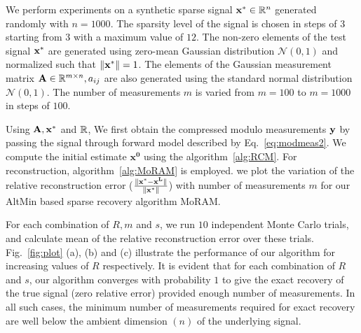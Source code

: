 We perform experiments on a synthetic sparse signal $\mathbf{x^*} \in {\mathbb{R}}^n$ generated randomly with $n=1000$. The sparsity level of the signal is chosen in steps of $3$ starting from $3$ with a maximum value of $12$. The non-zero elements of the test signal $\mathbf{x^*}$ are generated using zero-mean Gaussian distribution $\mathcal{N}(0, 1)$ and normalized such that $\|\mathbf{x^*}\| =1$. The elements of the Gaussian measurement matrix $\mathbf{A} \in {\mathbb{R}}^{m\times n}, a_{ij}$ are also generated using the standard normal distribution $\mathcal{N}(0, 1)$. The number of measurements $m$ is varied from $m = 100$ to $m=1000$ in steps of $100$.  



Using $\mathbf{A, x^*}$ and ${\mathbb{R}}$, We first obtain the compressed modulo measurements $\mathbf{y}$ by passing the signal through forward model described by Eq.~\ref{eq:modmeas2}. We compute the initial estimate $\mathbf{x^0}$ using the algorithm~\ref{alg:RCM}. For reconstruction, algorithm~\ref{alg:MoRAM} is employed. we plot the variation of the relative reconstruction error ($\frac{\|\mathbf{x^*-x^L}\|}{\|\mathbf{x^*}\|}$) with number of measurements $m$ for our AltMin based sparse recovery algorithm MoRAM.

For each combination of $R, m$ and $s$, we run $10$ independent Monte Carlo trials, and calculate mean of the relative reconstruction error over these trials. Fig.~\ref{fig:plot} (a), (b) and (c) illustrate the performance of our algorithm for increasing values of $R$ respectively. It is evident that for each combination of $R$ and $s$, our algorithm converges with probability $1$ to give the exact recovery of the true signal (zero relative error) provided enough number of measurements. In all such cases, the minimum number of measurements required for exact recovery are well below the ambient dimension $(n)$ of the underlying signal. 

